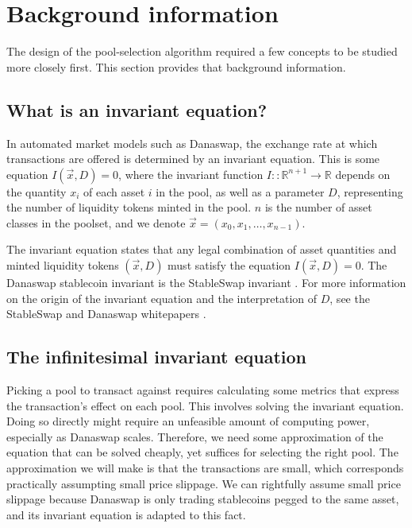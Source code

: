 \documentclass[12pt]{article}
\begin{document}
\section{Background information}

The design of the pool-selection algorithm required a few concepts to be studied
more closely first. This section provides that background information.

\subsection{What is an invariant equation?}

In automated market models such as Danaswap, the exchange rate at which
transactions are offered is determined by an invariant equation.
This is some equation $I(\vec{x}, D) = 0$, where the invariant function $I ::
\mathbb{R}^{n+1} \rightarrow \mathbb{R}$ depends on the quantity $x_i$ of each
asset $i$ in the pool, as well as a parameter $D$, representing the number of
liquidity tokens minted in the pool.
$n$ is the number of asset classes in the poolset, and we denote $\vec{x} =
(x_0, x_1, \ldots, x_{n-1})$.

The invariant equation states that any legal combination of asset quantities and
minted liquidity tokens $(\vec{x}, D)$ must satisfy the equation $I(\vec{x}, D)
= 0$.
The Danaswap stablecoin invariant is the StableSwap invariant \cite{stableswap}.
For more information on the origin of the invariant equation and the
interpretation of $D$, see the StableSwap and Danaswap whitepapers
\cite{stableswap, danaswap}.

\subsection{The infinitesimal invariant equation}

Picking a pool to transact against requires calculating some metrics
that express the transaction's effect on each pool.
This involves solving the invariant equation.
Doing so directly might require an unfeasible amount of computing power,
especially as Danaswap scales.
Therefore, we need some approximation of the equation that can be solved
cheaply, yet suffices for selecting the right pool.
The approximation we will make is that the transactions are small, which
corresponds practically assumpting small price slippage.
We can rightfully assume small price slippage because Danaswap is only trading
stablecoins pegged to the same asset, and its invariant equation is adapted to
this fact.
\end{document}
